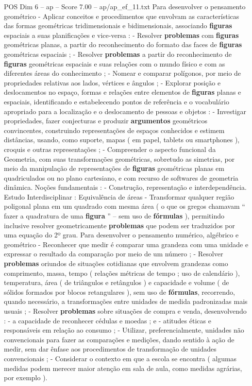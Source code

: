 \begin{textsample}{POS Dim 6 – ap – Score 7.00 – ap/ap\_ef\_11.txt}
Para desenvolver o pensamento geométrico - Aplicar conceitos e procedimentos que envolvam as características das formas geométricas tridimensionais e bidimensionais, associando \textbf{figuras} espaciais a suas planificações e vice-versa : - Resolver \textbf{problemas} com \textbf{figuras} geométricas planas, a partir do reconhecimento do formato das faces de \textbf{figuras} geométricas espaciais ; - Resolver \textbf{problemas} a partir do reconhecimento de \textbf{figuras} geométricas espaciais e suas relações com o mundo físico e com as diferentes áreas do conhecimento ; - Nomear e comparar polígonos, por meio de propriedades relativas aos lados, vértices e ângulos ; - Explorar posição e deslocamentos no espaço, formas e relações entre elementos de \textbf{figuras} planas e espaciais, identificando e estabelecendo pontos de referência e o vocabulário apropriado para a localização e o deslocamento de pessoas e objetos : - Investigar propriedades, fazer conjecturas e produzir \textbf{argumentos} geométricos convincentes, construindo representações de espaços conhecidos e estimem distâncias, usando, como suporte, mapas ( em papel, tablets ou smartphones ), croquis e outras representações ; - Compreender o aspecto funcional da Geometria, com suas transformações geométricas, sobretudo as simetrias, por meio da manipulação de representações de \textbf{figuras} geométricas planas em quadriculados ou no plano cartesiano, e com recurso de softwares de geometria dinâmica.
Noções fundamentais : - Construção, representação e interdependência.
Estudo Interdisciplinar : Equivalência de áreas - Transformar qualquer região poligonal plana em um quadrado com mesma área ( o que os gregos chamavam “ fazer a quadratura de uma \textbf{figura} ” – sem uso de \textbf{fórmulas} ), permitindo inclusive resolver geometricamente \textbf{problemas} que podem ser traduzidos por uma equação do 2º grau.
Para desenvolver o pensamento numérico, algébrico e geométrico - Reconhecer que medir é comparar uma grandeza com uma unidade e expressar o resultado da comparação por meio de um número ; - Resolver \textbf{problemas} oriundos de situações cotidianas que envolvem grandezas como comprimento, massa, tempo ( relações métricas de tempo ; uso de calendário ), temperatura, área ( de triângulos e retângulos ) e capacidade e volume ( de sólidos formados por blocos retangulares ), sem uso de \textbf{fórmulas}, recorrendo, quando necessário, a transformações entre unidades de medida padronizadas mais usuais ; - Resolver \textbf{problemas} sobre situações de compra e venda, desenvolvendo : - a capacidade de reconhecer cédulas e moedas ; e - atitudes éticas e responsáveis em relação ao consumo ; - Utilizar, preferencialmente, unidades não convencionais para fazer as comparações e medições, dando sentido à ação de medir, sem dar ênfase aos procedimentos de transformação de unidades convencionais ; - Considerar o contexto em que a escola se encontra ( algumas medidas podem merecer maior atenção em sala de aula, como medidas agrárias, por exemplo ).

\end{textsample}
